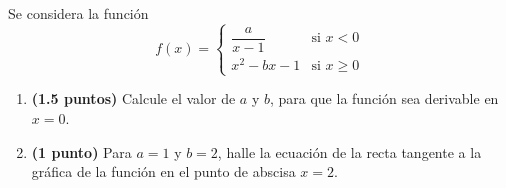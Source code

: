 
Se considera la función
\[
f(x)=\begin{cases}
\dfrac{a}{x-1} & \text{si }x<0\\[5pt]
x^2-bx-1 & \text{si }x\geq 0
\end{cases}
\]
\begin{enumerate}[label=\alph*)]
\item \textbf{(1.5 puntos)} Calcule el valor de $a$ y $b$, para que la función sea derivable en $x=0$.
\item \textbf{(1 punto)} Para $a=1$ y $b=2$, halle la ecuación de la recta tangente a la gráfica de la función en el punto de abscisa $x=2$.
\end{enumerate}

